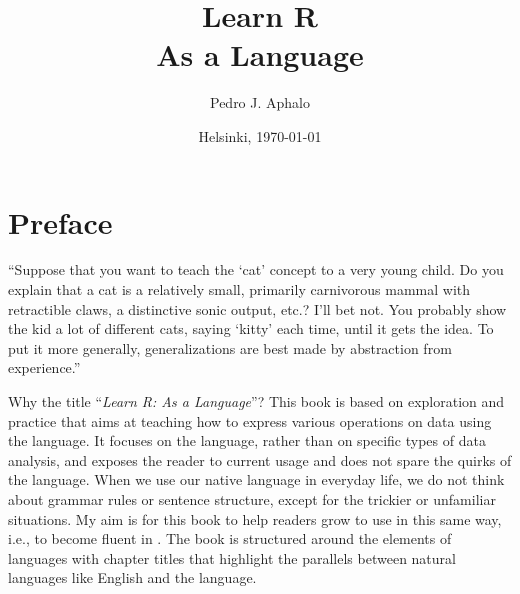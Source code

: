 \documentclass[krantz2]{krantz}\usepackage{knitr}
\begin{document}

\title{\Huge{\sffamily Learn R\\{\Large As a Language}}}

\author{Pedro J. Aphalo}

\date{Helsinki, \today}


















\frontmatter

\maketitle

\newpage

\setcounter{page}{5} %
\tableofcontents
\listoffigures
\listoftables



%


\chapter*{Preface}

\begin{VF}
``Suppose that you want to teach the `cat' concept to a very young child. Do you explain that a cat is a relatively small, primarily carnivorous mammal with retractible claws, a distinctive sonic output, etc.? I'll bet not. You probably show the kid a lot of different cats, saying `kitty' each time, until it gets the idea. To put it more generally, generalizations are best made by abstraction from experience.''

\nocite{Boas1981}
\end{VF}

\noindent
Why the title ``\emph{Learn R: As a Language}''? This book is based on exploration and practice that aims at teaching how to express various operations on data using the \Rlang language. It focuses on the language, rather than on specific types of data analysis, and exposes the reader to current usage and does not spare the quirks of the language. When we use our native language in everyday life, we do not think about grammar rules or sentence structure, except for the trickier or unfamiliar situations. My aim is for this book to help readers grow to use \Rlang in this same way, i.e., to become fluent in \Rlang. The book is structured around the elements of languages with chapter titles that highlight the parallels between natural languages like English and the \Rlang language.
\end{document}
